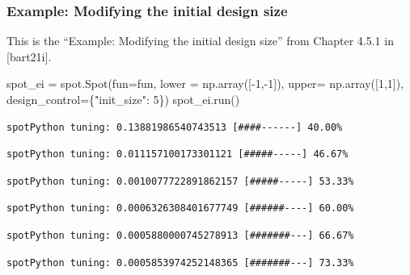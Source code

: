 \documentclass[
  letterpaper,
  DIV=11,
  numbers=noendperiod]{scrreprt}
\newenvironment{Shaded}{\begin{snugshade}}{\end{snugshade}}
\newcommand{\DecValTok}[1]{\textcolor[rgb]{0.68,0.00,0.00}{#1}}
\newcommand{\NormalTok}[1]{\textcolor[rgb]{0.00,0.23,0.31}{#1}}
\newcommand{\OperatorTok}[1]{\textcolor[rgb]{0.37,0.37,0.37}{#1}}
\newcommand{\StringTok}[1]{\textcolor[rgb]{0.13,0.47,0.30}{#1}}
\begin{document}
\hypertarget{example-modifying-the-initial-design-size}{%
\subsubsection{Example: Modifying the initial design
size}\label{example-modifying-the-initial-design-size}}

This is the ``Example: Modifying the initial design size'' from Chapter
4.5.1 in {[}bart21i{]}.

\begin{Shaded}
\begin{Highlighting}[]
\NormalTok{spot\_ei }\OperatorTok{=}\NormalTok{ spot.Spot(fun}\OperatorTok{=}\NormalTok{fun,}
\NormalTok{               lower }\OperatorTok{=}\NormalTok{ np.array([}\OperatorTok{{-}}\DecValTok{1}\NormalTok{,}\OperatorTok{{-}}\DecValTok{1}\NormalTok{]),}
\NormalTok{               upper}\OperatorTok{=}\NormalTok{ np.array([}\DecValTok{1}\NormalTok{,}\DecValTok{1}\NormalTok{]),}
\NormalTok{               design\_control}\OperatorTok{=}\NormalTok{\{}\StringTok{"init\_size"}\NormalTok{: }\DecValTok{5}\NormalTok{\})}
\NormalTok{spot\_ei.run()}
\end{Highlighting}
\end{Shaded}

\begin{verbatim}
spotPython tuning: 0.13881986540743513 [####------] 40.00% 
\end{verbatim}

\begin{verbatim}
spotPython tuning: 0.011157100173301121 [#####-----] 46.67% 
\end{verbatim}

\begin{verbatim}
spotPython tuning: 0.0010077722891862157 [#####-----] 53.33% 
\end{verbatim}

\begin{verbatim}
spotPython tuning: 0.0006326308401677749 [######----] 60.00% 
\end{verbatim}

\begin{verbatim}
spotPython tuning: 0.0005880000745278913 [#######---] 66.67% 
\end{verbatim}

\begin{verbatim}
spotPython tuning: 0.0005853974252148365 [#######---] 73.33% 
\end{verbatim}
\end{document}
